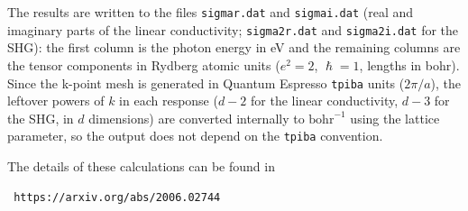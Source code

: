 \documentclass[a4paper,12pt]{report}
\begin{document}
The results are written to the files \texttt{sigmar.dat} and \texttt{sigmai.dat}
(real and imaginary parts of the linear conductivity;
\texttt{sigma2r.dat} and \texttt{sigma2i.dat} for the SHG):
the first column is the photon energy in eV and the remaining columns are the
tensor components in Rydberg atomic units ($e^2=2$, $\hslash=1$, lengths in bohr).
Since the k-point mesh is generated in {\sc Quantum Espresso} \texttt{tpiba} units
($2\pi/a$), the leftover powers of $k$ in each response
($d-2$ for the linear conductivity, $d-3$ for the SHG, in $d$ dimensions)
are converted internally to $\text{bohr}^{-1}$ using the lattice parameter,
so the output does not depend on the \texttt{tpiba} convention.

The details of these calculations can be found in
\begin{verbatim}
 https://arxiv.org/abs/2006.02744
\end{verbatim}
\end{document}
